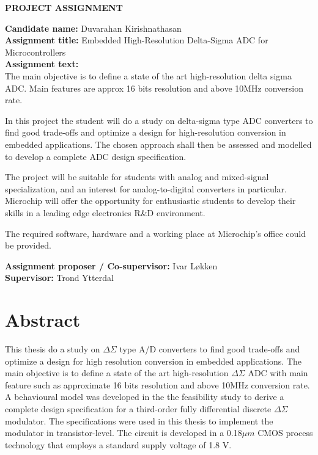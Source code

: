 \documentclass[pdftex,10pt,b5paper,twoside]{book}
\begin{document}
\frontmatter
%

\begin{center}
 \textbf{PROJECT ASSIGNMENT}\\[4ex]
\end{center}
\textbf{Candidate name:} Duvarahan Kirishnathasan\\[4ex]
\textbf{Assignment title:} Embedded High-Resolution Delta-Sigma ADC for Microcontrollers\\[4ex]
\textbf{Assignment text:}\\[2ex]
The main objective is to define a state of the art high-resolution delta sigma ADC. Main features are approx 16 bits resolution and above 10MHz conversion rate.

In this project the student will do a study on delta-sigma type ADC converters to find good trade-offs and optimize a design for high-resolution conversion in embedded applications. The chosen approach shall then be assessed and modelled to develop a complete ADC design specification.

The project will be suitable for students with analog and mixed-signal specialization, and an interest for analog-to-digital converters in particular. Microchip will offer the opportunity for enthusiastic students to develop their skills in a leading edge electronics R\&D environment.

The required software, hardware and a working place at Microchip’s office could be provided.


\textbf{Assignment proposer / Co-supervisor:} Ivar Løkken\\[4ex]
\textbf{Supervisor:} Trond Ytterdal




\chapter*{Abstract}

This thesis do a study on $\Delta\Sigma$ type A/D converters to find good trade-offs and optimize a design for high resolution conversion in embedded applications. The main objective is to define a state of the art high-resolution $\Delta\Sigma$ ADC with main feature such as approximate 16 bits resolution and above 10MHz conversion rate. A behavioural model was developed in the the feasibility study to derive a complete design specification for a third-order fully differential discrete $\Delta\Sigma$ modulator. The specifications were used in this thesis to implement the modulator in transistor-level. The circuit is developed in a 0.18$\mu m$ CMOS process technology that employs a standard supply voltage of 1.8 V.
\end{document}
